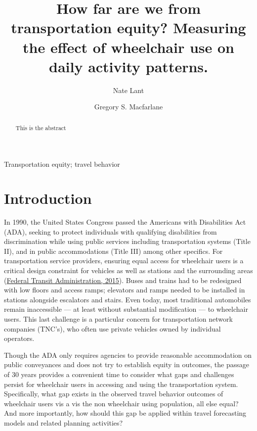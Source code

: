 \documentclass[3p, authoryear, review]{elsarticle} %
\begin{document}
\begin{frontmatter}

  \title{How far are we from transportation equity? Measuring the effect of wheelchair use on daily activity patterns.}
    \author[BYU]{Nate Lant}
    \author[BYU]{Gregory S. Macfarlane}
      \address[BYU]{Brigham Young University, Civil and Construction Engineering Department, 430 Engineering Building, Provo, Utah 84602}
  
  \begin{abstract}
  This is the abstract
  \end{abstract}
   \begin{keyword} Transportation equity; travel behavior\end{keyword}
 \end{frontmatter}

\hypertarget{intro}{%
\section{Introduction}\label{intro}}

In 1990, the United States Congress passed the Americans with Disabilities Act (ADA),
seeking to protect individuals with qualifying disabilities from discrimination
while using public services including transportation systems (Title II), and in
public accommodations (Title III) among other specifics. For transportation
service providers, ensuring equal access for wheelchair users is a critical
design constraint for vehicles as well as stations and the surrounding areas
(\protect\hyperlink{ref-fhwaada}{Federal Transit Administration, 2015}).
Buses and trains had to be redesigned with low floors and access ramps;
elevators and ramps needed to be installed in stations alongside escalators and
stairs. Even today, most traditional automobiles remain inaccessible --- at least
without substantial modification --- to wheelchair users. This last challenge is
a particular concern for transportation network companies (TNC's), who often use
private vehicles owned by individual operators.

Though the ADA only requires agencies to provide reasonable accommodation on
public conveyances and does not try to establish equity in outcomes, the passage
of 30 years provides a convenient time to consider what gaps and challenges
persist for wheelchair users in accessing and using the transportation system.
Specifically, what gap exists in the observed travel behavior outcomes of
wheelchair users vis a vis the non wheelchair using population, all else equal?
And more importantly, how should this gap be applied within travel forecasting
models and related planning activities?
\end{document}

